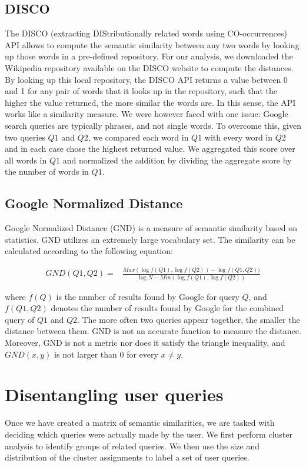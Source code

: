 \documentclass[11pt]{article}
\begin{document}
\begin{multicols}{2}
\subsection{DISCO}
\label{sec:disco}
The DISCO (extracting DIStributionally related words using CO-occurrences) API allows to compute the semantic similarity between any two words by looking up those words in a pre-defined repository. For our analysis, we downloaded the Wikipedia repository available on the DISCO website to compute the distances. By looking up this local repository, the DISCO API returns a value between 0 and 1 for any pair of words that it looks up in the repository, such that the higher the value returned, the more similar the words are. In this sense, the API works like a similarity measure. We were however faced with one issue: Google search queries are typically phrases, and not single words. To overcome this, given two queries $Q1$ and $Q2$, we compared each word in $Q1$ with every word in $Q2$ and in each case chose the highest returned value. We aggregated this score over all words in $Q1$ and normalized the addition by dividing the aggregate score by the number of words in $Q1$.

\subsection{Google Normalized Distance}
\label{sec:gnd}
Google Normalized Distance (GND) is a measure of semantic similarity based on statistics. GND utilizes an extremely large vocabulary set. The similarity can be calculated according to the following equation:

\begin{eqnarray}
\label{eq:gnd}
GND(Q1, Q2)=%
&\frac{Max(\log f(Q1), \log f(Q2))-\log f(Q1, Q2))}{\log N - Min(\log f(Q1), \log f(Q2))}
\end{eqnarray}

where $f(Q)$ is the number of results found by Google for query $Q$, and $f(Q1, Q2)$ denotes the number of results found by Google for the combined query of $Q1$ and $Q2$.
The more often two queries appear together, the smaller the distance between them. GND is not an accurate function to measure the distance\cite{DBLP:GND}. Moreover, GND is not a metric nor does it satisfy the triangle inequality, and $GND(x, y)$ is not larger than 0 for every $x \neq y$. 

\section{Disentangling user queries}
\label{sec:disentangle}
Once we have created a matrix of semantic similarities, we are tasked
with deciding which queries were actually made by the user. We first
perform cluster analysis to identify groups of related queries. We
then use the size and distribution of the cluster assignments to label a
set of user queries.


\end{multicols}
\end{document}
